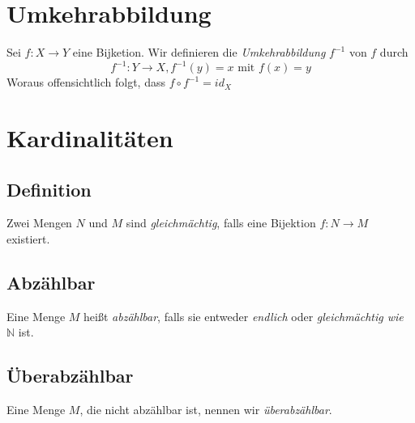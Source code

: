 \documentclass{scrreprt}
\newcommand{\NN}{\mathbb{N}}
\begin{document}
    \section{Umkehrabbildung}
    Sei $f : X \rightarrow Y$ eine Bijketion. Wir definieren die \emph{Umkehrabbildung} $f^{-1}$ von $f$ durch
    \begin{equation*}
        f^{-1} : Y \longrightarrow X, f^{-1}(y) = x \text{ mit } f(x) = y 
    \end{equation*} 
    Woraus offensichtlich folgt, dass $f \circ f^{-1} = id_X$

    \section{Kardinalitäten}
        \subsection{Definition}
        Zwei Mengen $N$ und $M$ sind \emph{gleichmächtig}, falls eine Bijektion $f: N \longrightarrow M$ existiert.
        \subsection{Abzählbar}
        Eine Menge $M$ heißt \emph{abzählbar}, falls sie entweder \emph{endlich} oder \emph{gleichmächtig wie $\NN$} ist.
        \subsection{Überabzählbar}
        Eine Menge $M$, die nicht abzählbar ist, nennen wir \emph{überabzählbar}.
\end{document}
